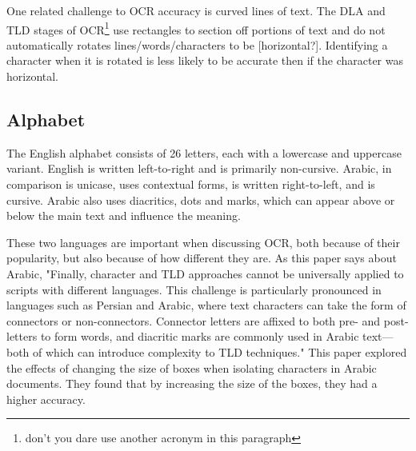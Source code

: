 \documentclass[sigplan,screen,nonacm]{acmart-tagged}
\begin{document}
One related challenge to OCR accuracy is curved lines of text. The DLA and TLD stages of OCR\footnote{don't you dare use another acronym in this paragraph} use rectangles to section off portions of text and do not automatically rotates lines/words/characters to be [horizontal?]. Identifying a character when it is rotated is less likely to be accurate then if the character was horizontal. \citep{Fateh:2024}

\subsection{Alphabet}
\label{Alphabet}

The English alphabet consists of 26 letters, each with a lowercase and uppercase variant. English is written left-to-right and is primarily non-cursive.
Arabic, in comparison is unicase, uses contextual forms, is written right-to-left, and is cursive. Arabic also uses diacritics, dots and marks, which can appear above or below the main text and influence the meaning.

These two languages are important when discussing OCR, both because of their popularity, but also because of how different they are. As this paper\cite{Fateh:2024} says about Arabic, "Finally, character and TLD approaches cannot be universally applied to scripts with different languages. This challenge is particularly pronounced in languages such as Persian and Arabic, where text characters can take the form of connectors or non-connectors. Connector letters are affixed to both pre- and post-letters to form words, and diacritic marks are commonly used in Arabic text—both of which can introduce complexity to TLD techniques." This paper explored the effects of changing the size of boxes when isolating characters in Arabic documents. They found that by increasing the size of the boxes, they had a higher accuracy. 


\end{document}
